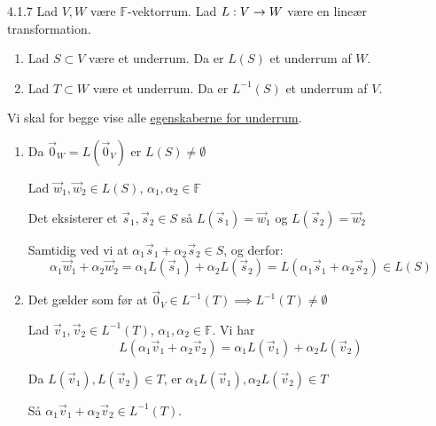 \begin{saetning}{4.1.7}
	Lad $V,W$ være $\mathbb{F}$-vektorrum. Lad $L: V \rightarrow W$ være en lineær
	transformation.

	\begin{enumerate}
		\item Lad $S \subset V$ være et underrum. Da er $L(S)$ et underrum af 
			$W$.
		\item Lad $T \subset W$ være et underrum. Da er $L^{-1}(S)$ et underrum
			af $V$.
	\end{enumerate}
\end{saetning}

\begin{bevis}
	Vi skal for begge vise alle
	\hyperlink{def:underrum}{egenskaberne for underrum}.
	\begin{enumerate}
		\item Da $\vec{0}_W = L(\vec{0}_V)$ er $L(S) \ne \emptyset$

			Lad $\vec{w}_1, \vec{w}_2 \in L(S)$, $\alpha_1, \alpha_2 \in \mathbb{F}$
			
			Det eksisterer et $\vec{s}_1, \vec{s}_2 \in S$ så
			$L(\vec{s}_1)=\vec{w}_1$ og $L(\vec{s}_2)=\vec{w}_2$

			Samtidig ved vi at $\alpha_1\vec{s}_1 + \alpha_2\vec{s}_2 \in S$,
			og derfor:
			$$
			\alpha_1\vec{w}_1 + \alpha_2\vec{w}_2 = \alpha_1L(\vec{s}_1) +
			\alpha_2L(\vec{s}_2) = L(\alpha_1\vec{s}_1 + \alpha_2\vec{s}_2)
			\in L(S)
			$$
		\item Det gælder som før at $\vec{0}_V \in L^{-1}(T) \implies
			L^{-1}(T) \ne \emptyset$

			Lad $\vec{v}_1, \vec{v}_2 \in L^{-1}(T)$,
			$\alpha_1, \alpha_2 \in \mathbb{F}$. Vi har
			$$ L(\alpha_1\vec{v}_1 + \alpha_2\vec{v}_2) = \alpha_1L(\vec{v}_1)
			+ \alpha_2L(\vec{v}_2) $$

			Da $L(\vec{v}_1), L(\vec{v}_2) \in T$, er $\alpha_1 L(\vec{v}_1),
			\alpha_2 L(\vec{v}_2) \in T$

			Så $\alpha_1\vec{v}_1 + \alpha_2\vec{v}_2 \in L^{-1}(T)$.
	\end{enumerate}
\end{bevis}
